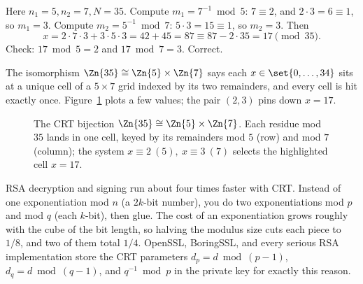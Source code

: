 \begin{example}
\label{ch40:ex-crt}
Here $n_1=5,n_2=7,N=35$. Compute $m_1 = 7^{-1}\bmod 5$: $7\equiv 2$, and $2\cdot 3=6\equiv 1$, so
$m_1=3$. Compute $m_2 = 5^{-1}\bmod 7$: $5\cdot 3=15\equiv 1$, so $m_2=3$. Then
\[
  x = 2\cdot 7\cdot 3 + 3\cdot 5\cdot 3 = 42 + 45 = 87 \equiv 87 - 2\cdot 35 = 17 \pmod{35}.
\]
Check: $17\bmod 5 = 2$ and $17\bmod 7 = 3$. Correct.
\end{example}

The isomorphism $\Zn{35}\cong\Zn{5}\times\Zn{7}$ says each $x\in\set{0,\dots,34}$ sits at a unique
cell of a $5\times 7$ grid indexed by its two remainders, and every cell is hit exactly once.
Figure~\ref{ch40:fig-crt} plots a few values; the pair $(2,3)$ pins down $x=17$.

\begin{figure}[H]
\centering
{}
\caption{The CRT bijection $\Zn{35}\cong\Zn{5}\times\Zn{7}$. Each residue mod $35$ lands in one cell,
keyed by its remainders mod $5$ (row) and mod $7$ (column); the system $x\equiv 2\ (5),\ x\equiv 3\
(7)$ selects the highlighted cell $x=17$.}
\label{ch40:fig-crt}
\end{figure}

\begin{applicationbox}
RSA decryption and signing run about four times faster with CRT. Instead of one exponentiation mod
$n$ (a $2k$-bit number), you do two exponentiations mod $p$ and mod $q$ (each $k$-bit), then glue.
The cost of an exponentiation grows roughly with the cube of the bit length, so halving the modulus
size cuts each piece to $1/8$, and two of them total $1/4$. OpenSSL, BoringSSL, and every serious
RSA implementation store the CRT parameters $d_p = d\bmod(p-1)$, $d_q = d\bmod(q-1)$, and
$q^{-1}\bmod p$ in the private key for exactly this reason.
\end{applicationbox}

